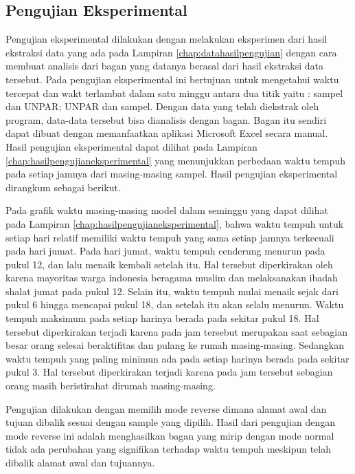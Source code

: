 \subsection{Pengujian Eksperimental}
\label{subsec:pengujianeksperimental}
Pengujian eksperimental dilakukan dengan melakukan eksperimen dari hasil ekstraksi data yang ada pada Lampiran \ref{chap:datahasilpengujian} dengan cara membuat analisis dari bagan yang datanya berasal dari hasil ekstraksi data tersebut. Pada pengujian eksperimental ini bertujuan untuk mengetahui waktu tercepat dan wakt terlambat dalam satu minggu antara dua titik yaitu : sampel dan UNPAR; UNPAR dan sampel. Dengan data yang telah diekstrak oleh program, data-data tersebut bisa dianalisis dengan bagan. Bagan itu sendiri dapat dibuat dengan memanfaatkan aplikasi Microsoft Excel secara manual. Hasil pengujian eksperimental dapat dilihat pada Lampiran \ref{chap:hasilpengujianeksperimental} yang menunjukkan perbedaan waktu tempuh pada setiap jamnya dari masing-masing sampel. Hasil pengujian eksperimental dirangkum sebagai berikut.

Pada grafik waktu masing-masing model dalam seminggu yang dapat dilihat pada Lampiran \ref{chap:hasilpengujianeksperimental}, bahwa waktu tempuh untuk setiap hari relatif memiliki waktu tempuh yang sama setiap jamnya terkecuali pada hari jumat. Pada hari jumat, waktu tempuh cenderung menurun pada pukul 12, dan lalu menaik kembali setelah itu. Hal tersebut diperkirakan oleh karena mayoritas warga indonesia beragama muslim dan melaksanakan ibadah shalat jumat pada pukul 12. Selain itu, waktu tempuh mulai menaik sejak dari pukul 6 hingga mencapai pukul 18, dan setelah itu akan selalu menurun. Waktu tempuh maksimum pada setiap harinya berada pada sekitar pukul 18. Hal tersebut diperkirakan terjadi karena pada jam tersebut merupakan saat sebagian besar orang selesai beraktifitas dan pulang ke rumah masing-masing. Sedangkan waktu tempuh yang paling minimun ada pada setiap harinya berada pada sekitar pukul 3. Hal tersebut diperkirakan terjadi karena pada jam tersebut sebagian orang masih beristirahat dirumah masing-masing.

Pengujian dilakukan dengan memilih mode reverse dimana alamat awal dan tujuan dibalik sesuai dengan sample yang dipilih. Hasil dari pengujian dengan mode reverse ini adalah menghasilkan bagan yang mirip dengan mode normal tidak ada perubahan yang signifikan terhadap waktu tempuh meskipun telah dibalik alamat awal dan tujuannya.